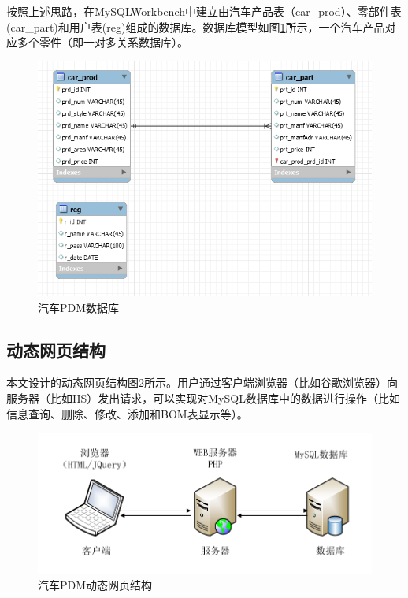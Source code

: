 按照上述思路，在MySQLWorkbench中建立由汽车产品表（car\_prod）、零部件表(car\_part)和用户表(reg)组成的数据库。数据库模型如图\ref{fig:cardb}所示，一个汽车产品对应多个零件（即一对多关系数据库）。
\begin{figure}[H]
\centering
\includegraphics[width=0.9\linewidth]{figure/cardb}
\caption{汽车PDM数据库}
\label{fig:cardb}
\end{figure}
\subsection{动态网页结构}
本文设计的动态网页结构图\ref{fig:webStruk}所示。用户通过客户端浏览器（比如谷歌浏览器）向服务器（比如IIS）发出请求，可以实现对MySQL数据库中的数据进行操作（比如信息查询、删除、修改、添加和BOM表显示等）。
\begin{figure}[H]
\centering
\includegraphics[width=1\linewidth]{figure/webStruk}
\caption{汽车PDM动态网页结构}
\label{fig:webStruk}
\end{figure}

\par~~~~~~~~~~

